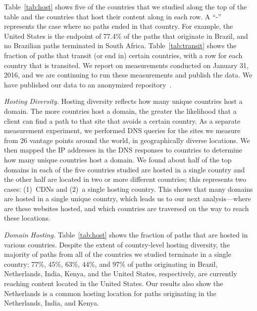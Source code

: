 

Table~\ref{tab:host} shows five of the countries that we studied along the top
of the table and the countries that host their content along in each row.  A
``-'' represents the case where no paths ended in that country. For example,
the United States is the endpoint of 77.4\% of the paths that originate in
Brazil, and no Brazilian paths terminated in South Africa.
Table~\ref{tab:transit} shows the fraction of paths that transit (or end in)
certain countries, with a row for each country that is transited.  We report 
on measurements conducted on January 31, 2016, and we are continuing to run 
these measurements and publish the data.  We have published our data 
to an anonymized repository~\cite{ransom_data}.

{\it Hosting Diversity.}  Hosting diversity reflects how many unique
countries host a domain.  The more countries host a domain, the greater the
likelihood that a client can find a path to that site that avoids a certain
country. As a separate measurement experiment, we performed DNS queries for the
sites we measure from 26 vantage points around the world, in
geographically diverse locations. We then mapped the IP addresses in the DNS
responses to countries to determine how many unique countries host a domain.
We found about half of the top domains in each of
the five countries studied are hosted in a single country and the other half are
located in two or more different countries; this represents two cases:
(1)~CDNs and (2)~a single hosting country.  This shows that many domains are
hosted in a single unique country, which leads us to our next analysis---where
are these websites hosted, and which countries are traversed on the way to
reach these locations.



{\it Domain Hosting.} Table~\ref{tab:host} shows the fraction of paths that are hosted in various
countries.  Despite the extent of country-level hosting diversity, the
majority of paths from all of the countries we studied terminate in a single
country; 77\%, 45\%, 63\%, 44\%, and 97\% of paths originating in Brazil, Netherlands, India,
Kenya, and the United States, respectively, are currently reaching content located in the
United States.   Our results also
show the Netherlands is a common hosting location for paths originating in the
Netherlands, India, and Kenya.


